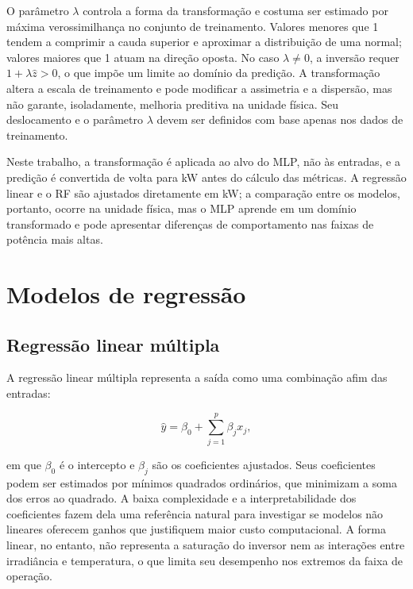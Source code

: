 O parâmetro $\lambda$ controla a forma da transformação e costuma ser
estimado por máxima verossimilhança no conjunto de treinamento. Valores
menores que 1 tendem a comprimir a cauda superior e aproximar a
distribuição de uma normal; valores maiores que 1 atuam na direção
oposta. No caso $\lambda\neq0$, a inversão requer
$1+\lambda\widehat{z}>0$, o que impõe um limite ao domínio da predição. A
transformação altera a escala de treinamento e pode modificar a
assimetria e a dispersão, mas não garante, isoladamente, melhoria
preditiva na unidade física. Seu deslocamento e o parâmetro $\lambda$
devem ser definidos com base apenas nos dados de treinamento.

Neste trabalho, a transformação é aplicada ao alvo do MLP, não às
entradas, e a predição é convertida de volta para kW antes do cálculo das
métricas. A regressão linear e o RF são ajustados diretamente em kW; a
comparação entre os modelos, portanto, ocorre na unidade física, mas o
MLP aprende em um domínio transformado e pode apresentar diferenças de
comportamento nas faixas de potência mais altas.

\section{Modelos de regressão}
\label{sec:ft-modelos}

\subsection{Regressão linear múltipla}
\label{subsec:ft-regressao-linear}

A regressão linear múltipla representa a saída como uma combinação afim
das entradas:

\begin{equation}
\label{eq:ft-regressao-linear}
\hat{y}=\beta_0+\sum_{j=1}^{p}\beta_j x_j,
\end{equation}

\noindent em que $\beta_0$ é o intercepto e $\beta_j$ são os coeficientes
ajustados. Seus coeficientes podem ser estimados por mínimos quadrados
ordinários, que minimizam a soma dos erros ao quadrado. A baixa
complexidade e a interpretabilidade dos coeficientes fazem dela uma
referência natural para investigar se modelos não lineares oferecem
ganhos que justifiquem maior custo computacional. A forma linear, no
entanto, não representa a saturação do inversor nem as interações entre
irradiância e temperatura, o que limita seu desempenho nos extremos da
faixa de operação.

